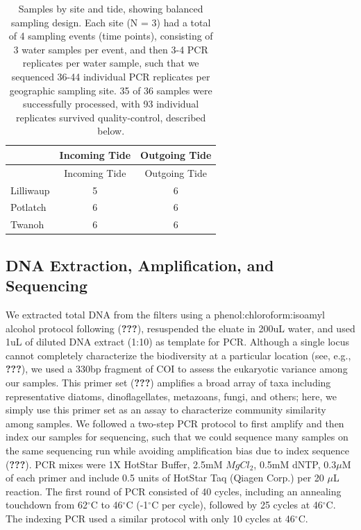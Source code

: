 \documentclass[fleqn,10pt,lineno]{wlpeerj} %
\begin{document}
\begin{longtable}[]{@{}lcc@{}}
\caption{Samples by site and tide, showing balanced sampling design.
Each site (N = 3) had a total of 4 sampling events (time points),
consisting of 3 water samples per event, and then 3-4 PCR replicates per
water sample, such that we sequenced 36-44 individual PCR replicates per
geographic sampling site. 35 of 36 samples were successfully processed,
with 93 individual replicates survived quality-control, described
below.}\tabularnewline
\toprule
& Incoming Tide & Outgoing Tide\tabularnewline
\midrule
\endfirsthead
\toprule
& Incoming Tide & Outgoing Tide\tabularnewline
\midrule
\endhead
Lilliwaup & 5 & 6\tabularnewline
Potlatch & 6 & 6\tabularnewline
Twanoh & 6 & 6\tabularnewline
\bottomrule
\end{longtable}

\subsection{DNA Extraction, Amplification, and
Sequencing}\label{dna-extraction-amplification-and-sequencing}

We extracted total DNA from the filters using a
phenol:chloroform:isoamyl alcohol protocol following ({\textbf{???}}),
resuspended the eluate in 200uL water, and used 1uL of diluted DNA
extract (1:10) as template for PCR. Although a single locus cannot
completely characterize the biodiversity at a particular location (see,
e.g., {\textbf{???}}), we used a 330bp fragment of COI to assess the
eukaryotic variance among our samples. This primer set ({\textbf{???}})
amplifies a broad array of taxa including representative diatoms,
dinoflagellates, metazoans, fungi, and others; here, we simply use this
primer set as an assay to characterize community similarity among
samples. We followed a two-step PCR protocol to first amplify and then
index our samples for sequencing, such that we could sequence many
samples on the same sequencing run while avoiding amplification bias due
to index sequence ({\textbf{???}}). PCR mixes were 1X HotStar Buffer,
2.5mM \(MgCl_2\), 0.5mM dNTP, 0.3\(\mu\)M of each primer and include 0.5
units of HotStar Taq (Qiagen Corp.) per 20 \(\mu\)L reaction. The first
round of PCR consisted of 40 cycles, including an annealing touchdown
from 62\(^\circ\)C to 46\(^\circ\)C (-1\(^\circ\)C per cycle), followed
by 25 cycles at 46\(^\circ\)C. The indexing PCR used a similar protocol
with only 10 cycles at 46\(^\circ\)C.
\end{document}
